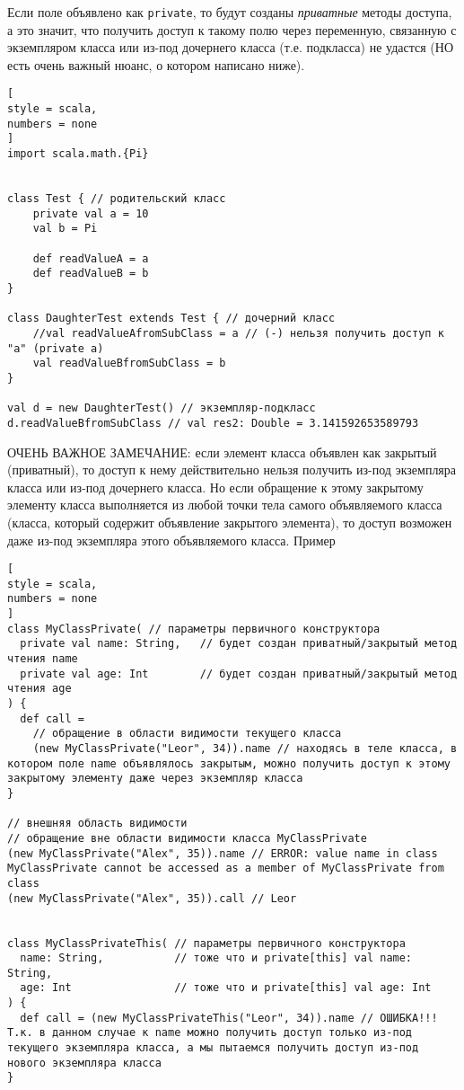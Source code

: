 \documentclass[%
	11pt,
	a4paper,
	utf8,
		]{article}
\begin{document}
Если поле объявлено как \texttt{private}, то будут созданы \emph{приватные} методы доступа, а это значит, что получить доступ к такому полю через переменную, связанную с экземпляром класса или из-под дочернего класса (т.е. подкласса) не удастся (НО есть очень важный нюанс, о котором написано ниже).
\begin{lstlisting}[
style = scala,
numbers = none	
]
import scala.math.{Pi}


class Test { // родительский класс
	private val a = 10
	val b = Pi
	
	def readValueA = a
	def readValueB = b
}

class DaughterTest extends Test { // дочерний класс
	//val readValueAfromSubClass = a // (-) нельзя получить доступ к "a" (private a)
	val readValueBfromSubClass = b
}

val d = new DaughterTest() // экземпляр-подкласс
d.readValueBfromSubClass // val res2: Double = 3.141592653589793
\end{lstlisting}


{\color{blue} ОЧЕНЬ ВАЖНОЕ ЗАМЕЧАНИЕ: если элемент класса объявлен как закрытый (приватный), то доступ к нему действительно нельзя получить из-под экземпляра класса или из-под дочернего класса. Но если обращение к этому закрытому элементу класса выполняется из любой точки тела самого объявляемого класса (класса, который содержит объявление закрытого элемента), то доступ возможен даже из-под экземпляра этого объявляемого класса. Пример}

\begin{lstlisting}[
style = scala,
numbers = none	
]
class MyClassPrivate( // параметры первичного конструктора
  private val name: String,   // будет создан приватный/закрытый метод чтения name
  private val age: Int        // будет создан приватный/закрытый метод чтения age
) {
  def call = 
    // обращение в области видимости текущего класса
    (new MyClassPrivate("Leor", 34)).name // находясь в теле класса, в котором поле name объявлялось закрытым, можно получить доступ к этому закрытому элементу даже через экземпляр класса
}

// внешняя область видимости
// обращение вне области видимости класса MyClassPrivate
(new MyClassPrivate("Alex", 35)).name // ERROR: value name in class MyClassPrivate cannot be accessed as a member of MyClassPrivate from class
(new MyClassPrivate("Alex", 35)).call // Leor


class MyClassPrivateThis( // параметры первичного конструктора
  name: String,           // тоже что и private[this] val name: String,
  age: Int                // тоже что и private[this] val age: Int
) {
  def call = (new MyClassPrivateThis("Leor", 34)).name // ОШИБКА!!! Т.к. в данном случае к name можно получить доступ только из-под текущего экземпляра класса, а мы пытаемся получить доступ из-под нового экземпляра класса
}


\end{lstlisting}
\end{document}
